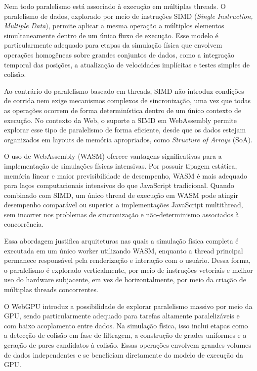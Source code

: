 Nem todo paralelismo está associado à execução em múltiplas threads. O paralelismo de dados, explorado por meio de instruções SIMD (\textit{Single Instruction, Multiple Data}), permite aplicar a mesma operação a múltiplos elementos simultaneamente dentro de um único fluxo de execução. Esse modelo é particularmente adequado para etapas da simulação física que envolvem operações homogêneas sobre grandes conjuntos de dados, como a integração temporal das posições, a atualização de velocidades implícitas e testes simples de colisão.

Ao contrário do paralelismo baseado em threads, SIMD não introduz condições de corrida nem exige mecanismos complexos de sincronização, uma vez que todas as operações ocorrem de forma determinística dentro de um único contexto de execução. No contexto da Web, o suporte a SIMD em WebAssembly permite explorar esse tipo de paralelismo de forma eficiente, desde que os dados estejam organizados em layouts de memória apropriados, como \textit{Structure of Arrays} (SoA).

O uso de WebAssembly (WASM) oferece vantagens significativas para a implementação de simulações físicas intensivas. Por possuir tipagem estática, memória linear e maior previsibilidade de desempenho, WASM é mais adequado para laços computacionais intensivos do que JavaScript tradicional. Quando combinado com SIMD, um único thread de execução em WASM pode atingir desempenho comparável ou superior a implementações JavaScript multithread, sem incorrer nos problemas de sincronização e não-determinismo associados à concorrência.

Essa abordagem justifica arquiteturas nas quais a simulação física completa é executada em um único worker utilizando WASM, enquanto a thread principal permanece responsável pela renderização e interação com o usuário. Dessa forma, o paralelismo é explorado verticalmente, por meio de instruções vetoriais e melhor uso do hardware subjacente, em vez de horizontalmente, por meio da criação de múltiplas threads concorrentes.

O WebGPU introduz a possibilidade de explorar paralelismo massivo por meio da GPU, sendo particularmente adequado para tarefas altamente paralelizáveis e com baixo acoplamento entre dados. Na simulação física, isso inclui etapas como a detecção de colisão em fase de filtragem, a construção de grades uniformes e a geração de pares candidatos à colisão. Essas operações envolvem grandes volumes de dados independentes e se beneficiam diretamente do modelo de execução da GPU.

